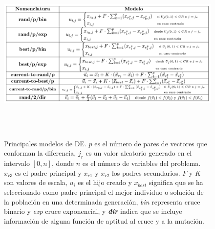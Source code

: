 \begin{figure}[!htp]
\centering
\includegraphics[width=13.2cm,height=9cm]{figuras/modelosDE.jpg}
\caption{Principales modelos de DE. $p$ es el número de pares de vectores que
conforman la diferencia, $j_{r}$ es un valor aleatorio generado en el
intervalo $\left[ 0,n\right]$, donde $n$ es el número de variables del problema.
$x_{r3}$ es el padre principal y $x_{r1}$ y $x_{r2}$ los padres
secundarios. $F$ y $K$ son valores de
escala, $u_{i}$ es el hijo creado y $x_{best}$ significa que se ha seleccionado como padre
principal el mejor individuo o solución de la población en una determinada generación,
\textit{bin} representa cruce binario y \textit{exp} cruce exponencial, y \textit{\textbf{dir}}
indica que se incluye información de alguna función de aptitud al cruce y a la mutación.}
\label{diferencial2}
\end{figure}

